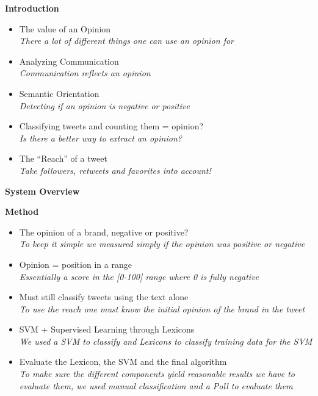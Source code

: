 \documentclass[landscape,20pt]{extarticle}
\newcommand*{\TitleFont}{\Huge \bf}
\newcommand*{\TextFont}{\normalsize \it}
\begin{document}
\thispagestyle{empty}
\Large
{\TitleFont Introduction}

\begin{itemize}
\item The value of an Opinion\\
{\TextFont There a lot of different things one can use an opinion for}
\item Analyzing Communication\\
{\TextFont Communication reflects an opinion}
\item Semantic Orientation\\
{\TextFont Detecting if an opinion is negative or positive}
\item Classifying tweets and counting them = opinion?\\
{\TextFont Is there a better way to extract an opinion?}
\item The ``Reach'' of a tweet\\
{\TextFont Take followers, retweets and favorites into account!}
\end{itemize}

\clearpage
\thispagestyle{empty}

{\TitleFont System Overview}

\clearpage
\thispagestyle{empty}

{\TitleFont Method}

\begin{itemize}
\item The opinion of a brand, negative or positive?\\
{\TextFont To keep it simple we measured simply if the opinion was positive or negative}
\item Opinion = position in a range\\
{\TextFont Essentially a score in the [0-100] range where 0 is fully negative}
\item Must still classify tweets using the text alone\\
{\TextFont To use the reach one must know the initial opinion of the brand in the tweet}
\item SVM + Supervised Learning through Lexicons\\
{\TextFont We used a SVM to classify and Lexicons to classify training data for the SVM}
\item Evaluate the Lexicon, the SVM and the final algorithm\\
{\TextFont To make sure the different components yield reasonable results we have to \\evaluate them, we used manual classification and a Poll to evaluate them}
\end{itemize}
\end{document}
